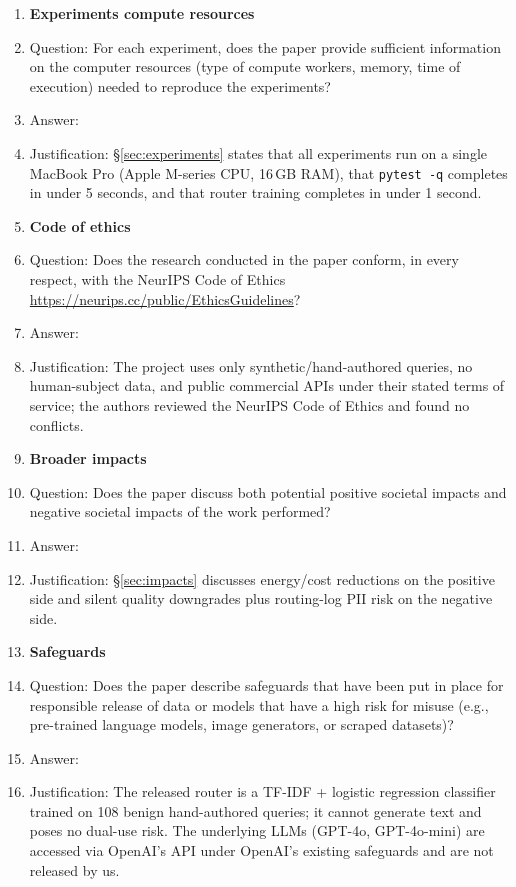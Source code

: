 \begin{enumerate}
\item {\bf Experiments compute resources}
    \item[] Question: For each experiment, does the paper provide sufficient information on the computer resources (type of compute workers, memory, time of execution) needed to reproduce the experiments?
    \item[] Answer: \answerYes{}
    \item[] Justification: \S\ref{sec:experiments} states that all experiments run on a single MacBook Pro (Apple M-series CPU, 16\,GB RAM), that \texttt{pytest -q} completes in under 5 seconds, and that router training completes in under 1 second.

\item {\bf Code of ethics}
    \item[] Question: Does the research conducted in the paper conform, in every respect, with the NeurIPS Code of Ethics \url{https://neurips.cc/public/EthicsGuidelines}?
    \item[] Answer: \answerYes{}
    \item[] Justification: The project uses only synthetic/hand-authored queries, no human-subject data, and public commercial APIs under their stated terms of service; the authors reviewed the NeurIPS Code of Ethics and found no conflicts.

\item {\bf Broader impacts}
    \item[] Question: Does the paper discuss both potential positive societal impacts and negative societal impacts of the work performed?
    \item[] Answer: \answerYes{}
    \item[] Justification: \S\ref{sec:impacts} discusses energy/cost reductions on the positive side and silent quality downgrades plus routing-log PII risk on the negative side.

\item {\bf Safeguards}
    \item[] Question: Does the paper describe safeguards that have been put in place for responsible release of data or models that have a high risk for misuse (e.g., pre-trained language models, image generators, or scraped datasets)?
    \item[] Answer: \answerNA{}
    \item[] Justification: The released router is a TF-IDF + logistic regression classifier trained on 108 benign hand-authored queries; it cannot generate text and poses no dual-use risk. The underlying LLMs (GPT-4o, GPT-4o-mini) are accessed via OpenAI's API under OpenAI's existing safeguards and are not released by us.


\end{enumerate}
